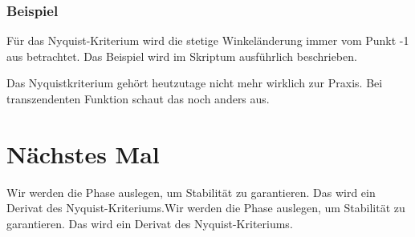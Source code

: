 \documentclass[a4paper]{article}
\begin{document}
\subsubsection*{Beispiel}
 Für das Nyquist-Kriterium wird die stetige Winkeländerung immer vom Punkt -1 aus betrachtet. Das Beispiel wird im Skriptum ausführlich beschrieben.

 Das Nyquistkriterium gehört heutzutage nicht mehr wirklich zur Praxis. Bei transzendenten Funktion schaut das noch anders aus.

 \section*{Nächstes Mal}
 Wir werden die Phase auslegen, um Stabilität zu garantieren. Das wird ein Derivat des Nyquist-Kriteriums.Wir werden die Phase auslegen, um Stabilität zu garantieren. Das wird ein Derivat des Nyquist-Kriteriums.
\end{document}
